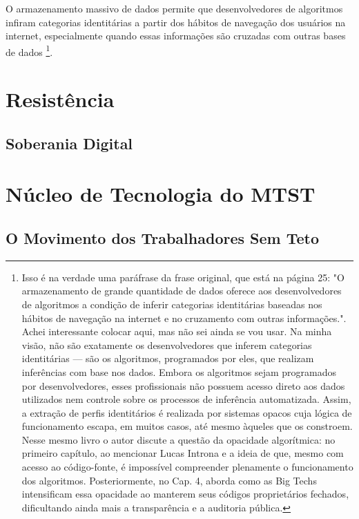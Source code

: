O armazenamento massivo de dados permite que desenvolvedores de algoritmos infiram categorias identitárias a partir dos hábitos de navegação dos usuários na internet, especialmente quando essas informações são cruzadas com outras bases de dados \cite{silveira-demcodigos}\footnote{Isso é na verdade uma paráfrase da frase original, que está na página 25: 
"O armazenamento de grande quantidade de dados oferece aos desenvolvedores de algoritmos a condição de inferir categorias identitárias baseadas nos hábitos de navegação na internet e no cruzamento com outras informações.". Achei interessante colocar aqui, mas não sei ainda se vou usar. Na minha visão, não são exatamente os desenvolvedores que inferem categorias identitárias — são os algoritmos, programados por eles, que realizam inferências com base nos dados. Embora os algoritmos sejam programados por desenvolvedores, esses profissionais não possuem acesso direto aos dados utilizados nem controle sobre os processos de inferência automatizada. Assim, a extração de perfis identitários é realizada por sistemas opacos cuja lógica de funcionamento escapa, em muitos casos, até mesmo àqueles que os constroem. Nesse mesmo livro o autor discute a questão da opacidade algorítmica: no primeiro capítulo, ao mencionar Lucas Introna e a ideia de que, mesmo com acesso ao código-fonte, é impossível compreender plenamente o funcionamento dos algoritmos. Posteriormente, no Cap. 4, aborda como as Big Techs intensificam essa opacidade ao manterem seus códigos proprietários fechados, dificultando ainda mais a transparência e a auditoria pública.}.

\section{Resistência}
\label{sec:resis}

\subsection{Soberania Digital}
\label{subsec:soberania}

\section{Núcleo de Tecnologia do MTST}
\label{sec:nucleomtst}

\subsection{O Movimento dos Trabalhadores Sem Teto }
\label{subsec:mtst}

